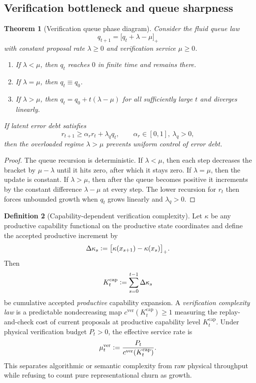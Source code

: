 \documentclass[11pt]{article}
\newtheorem{theorem}{Theorem}[section]
\theoremstyle{definition}
\newtheorem{definition}[theorem]{Definition}
\newcommand{\1}{\mathbf{1}}
\newcommand{\Defeq}{\vcentcolon=}
\begin{document}
\subsection{Verification bottleneck and queue sharpness}
\begin{theorem}[Verification queue phase diagram]\label{thm:queue_phase}
Consider the fluid queue law
\[
q_{t+1}=\bigl[q_t+\lambda-\mu\bigr]_+
\]
with constant proposal rate $\lambda\ge0$ and verification service $\mu\ge0$.
\begin{enumerate}[label=(\roman*), leftmargin=2em]
  \item If $\lambda<\mu$, then $q_t$ reaches $0$ in finite time and remains there.
  \item If $\lambda=\mu$, then $q_t\equiv q_0$.
  \item If $\lambda>\mu$, then $q_t=q_0+t(\lambda-\mu)$ for all sufficiently large $t$ and diverges linearly.
\end{enumerate}
If latent error debt satisfies
\[
r_{t+1}\ge \alpha_r r_t + \lambda_q q_t,
\qquad \alpha_r\in[0,1],\ \lambda_q>0,
\]
then the overloaded regime $\lambda>\mu$ prevents uniform control of error debt.
\end{theorem}

\begin{proof}
The queue recursion is deterministic. If $\lambda<\mu$, then each step decreases the bracket by $\mu-\lambda$ until it hits zero, after which it stays zero. If $\lambda=\mu$, then the update is constant. If $\lambda>\mu$, then after the queue becomes positive it increments by the constant difference $\lambda-\mu$ at every step. The lower recursion for $r_t$ then forces unbounded growth when $q_t$ grows linearly and $\lambda_q>0$.
\end{proof}

\begin{definition}[Capability-dependent verification complexity]\label{def:red_queen}
Let $\kappa$ be any productive capability functional on the productive state coordinates and define the accepted productive increment by
\[
\Delta \kappa_s\Defeq \bigl[\kappa(x_{s+1})-\kappa(x_s)\bigr]_+.
\]
Then
\[
K_t^{\mathrm{cap}}\Defeq \sum_{s=0}^{t-1}\Delta \kappa_s
\]
be cumulative accepted \emph{productive} capability expansion. A \emph{verification complexity law} is a predictable nondecreasing map $c^{\mathrm{ver}}(K_t^{\mathrm{cap}})\ge 1$ measuring the replay-and-check cost of current proposals at productive capability level $K_t^{\mathrm{cap}}$. Under physical verification budget $P_t>0$, the effective service rate is
\[
\mu_t^{\mathrm{ver}}\Defeq \frac{P_t}{c^{\mathrm{ver}}(K_t^{\mathrm{cap}})}.
\]
This separates algorithmic or semantic complexity from raw physical throughput while refusing to count pure representational churn as growth.
\end{definition}
\end{document}

